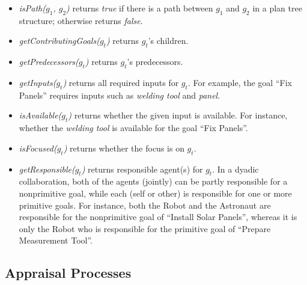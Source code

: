\begin{itemize}[leftmargin=2pt]
  \item \textit{isPath($g_1$, $g_2$)} returns \textit{true} if there is a path
  between $g_1$ and $g_2$ in a plan tree structure; otherwise returns
  \textit{false}.
  
  
  \item \textit{getContributingGoals($g_t$)} returns $g_t$'s children.
  
  \item \textit{getPredecessors($g_t$)} returns $g_t$'s predecessors.
  
  \item \textit{getInputs($g_t$)} returns all required inputs for $g_t$. For
  example, the goal ``Fix Panels'' requires inputs such as \textit{welding tool}
  and \textit{panel}.
  
  \item \textit{isAvailable($g_t$)} returns whether the given input is
  available. For instance, whether the \textit{welding tool} is available for the
  goal ``Fix Panels''.
  
  
  \item \textit{isFocused($g_t$)} returns whether the focus is on $g_t$.
  
  \item \textit{getResponsible($g_t$)} returns responsible agent(s) for $g_t$.
  In a dyadic collaboration, both of the agents (jointly) can be partly
  responsible for a nonprimitive goal, while each (self or other) is responsible
  for one or more primitive goals. For instance, both the Robot and the
  Astronaut are responsible for the nonprimitive goal of ``Install Solar
  Panels'', whereas it is only the Robot who is responsible for the
  primitive goal of ``Prepare Measurement Tool''.
\end{itemize}

\subsection{Appraisal Processes}
\label{sec:appraisal}

